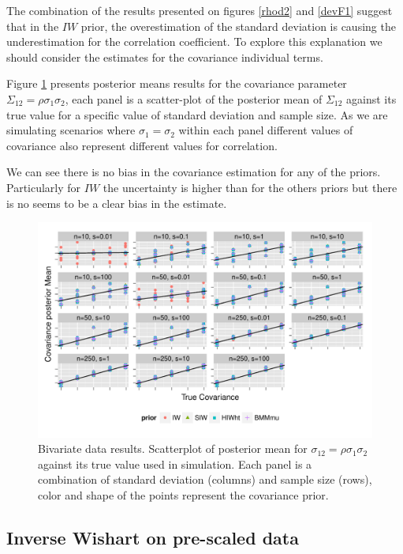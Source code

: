 \documentclass{article}
\begin{document}
The combination of the results presented on figures \ref{rhod2} and \ref{devF1}  suggest that in the $IW$ prior, the overestimation of the standard deviation is causing the underestimation for the correlation coefficient. To explore this explanation we should consider the estimates for the covariance individual terms. 

Figure \ref{devCov} presents posterior means results for the covariance parameter $\Sigma_{12}=\rho\sigma_1\sigma_2$, each panel is a scatter-plot of the posterior mean of $\Sigma_{12}$ against its true value for a specific value of standard deviation and sample size. As we are simulating scenarios where $\sigma_1 = \sigma_2$ within each panel different values of covariance also represent different values for correlation. 

We can see there is no bias in the covariance estimation for any of the priors. Particularly for $IW$ the uncertainty is higher than for the others priors but there is no seems to be a clear bias in the estimate. 
\begin{figure}[htbp]
   \centering
   \includegraphics[width=\textwidth]{fig_cov_d2} 
    \vspace{-.5in}
   \caption{Bivariate data results. Scatterplot of posterior mean for $\sigma_{12}=\rho\sigma_1\sigma_2$  against its true value used in simulation. Each panel is a combination of standard deviation (columns) and sample size (rows),  color and shape of the points represent the covariance prior. \label{devCov} }
\end{figure}

\subsection{Inverse Wishart on pre-scaled data}
\end{document}
